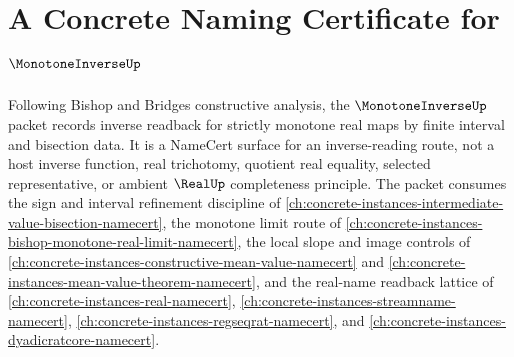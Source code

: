 \chapter{A Concrete Naming Certificate for $\MonotoneInverseUp$}
\label{ch:concrete-instances-monotone-inverse-namecert}

Following Bishop and Bridges constructive analysis, the $\MonotoneInverseUp$ packet records inverse readback for strictly monotone real maps by finite interval and bisection data. It is a NameCert surface for an inverse-reading route, not a host inverse function, real trichotomy, quotient real equality, selected representative, or ambient $\RealUp$ completeness principle. The packet consumes the sign and interval refinement discipline of \autoref{ch:concrete-instances-intermediate-value-bisection-namecert}, the monotone limit route of \autoref{ch:concrete-instances-bishop-monotone-real-limit-namecert}, the local slope and image controls of \autoref{ch:concrete-instances-constructive-mean-value-namecert} and \autoref{ch:concrete-instances-mean-value-theorem-namecert}, and the real-name readback lattice of \autoref{ch:concrete-instances-real-namecert}, \autoref{ch:concrete-instances-streamname-namecert}, \autoref{ch:concrete-instances-regseqrat-namecert}, and \autoref{ch:concrete-instances-dyadicratcore-namecert}.

